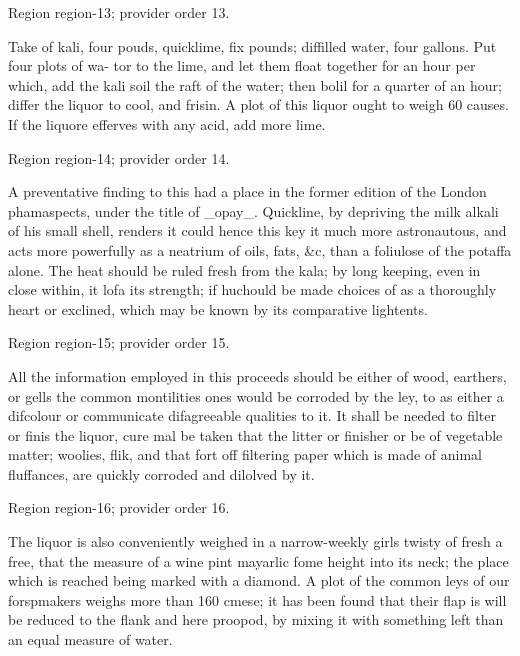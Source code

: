 \documentclass[11pt]{article}
\begin{document}
{\scriptsize\color{gray} Region region-13; provider order 13.\par}
\medskip

Take of kali, four pouds, quicklime, fix pounds; diffilled water, four gallons. Put four plots of wa- tor to the lime, and let them float together for an hour per which, add the kali soil the raft of the water; then bolil for a quarter of an hour; differ the liquor to cool, and frisin. A plot of this liquor ought to weigh 60 causes. If the liquore efferves with any acid, add more lime.
\par

{\scriptsize\color{gray} Region region-14; provider order 14.\par}
\medskip

A preventative finding to this had a place in the former edition of the London phamaspects, under the title of \_opay\_. Quickline, by depriving the milk alkali of his small shell, renders it could hence this key it much more astronautous, and acts more powerfully as a neatrium of oils, fats, \&c, than a foliulose of the potaffa alone. The heat should be ruled fresh from the kala; by long keeping, even in close within, it lofa its strength; if huchould be made choices of as a thoroughly heart or exclined, which may be known by its comparative lightents.
\par

{\scriptsize\color{gray} Region region-15; provider order 15.\par}
\medskip

All the information employed in this proceeds should be either of wood, earthers, or gells the common montilities ones would be corroded by the ley, to as either a difcolour or communicate difagreeable qualities to it. It shall be needed to filter or finis the liquor, cure mal be taken that the litter or finisher or be of vegetable matter; woolies, flik, and that fort off filtering paper which is made of animal fluffances, are quickly corroded and dilolved by it.
\par

{\scriptsize\color{gray} Region region-16; provider order 16.\par}
\medskip

The liquor is also conveniently weighed in a narrow-weekly girls twisty of fresh a free, that the measure of a wine pint mayarlic fome height into its neck; the place which is reached being marked with a diamond. A plot of the common leys of our forspmakers weighs more than 160 cmese; it has been found that their flap is will be reduced to the flank and here proopod, by mixing it with something left than an equal measure of water.
\par
\end{document}
